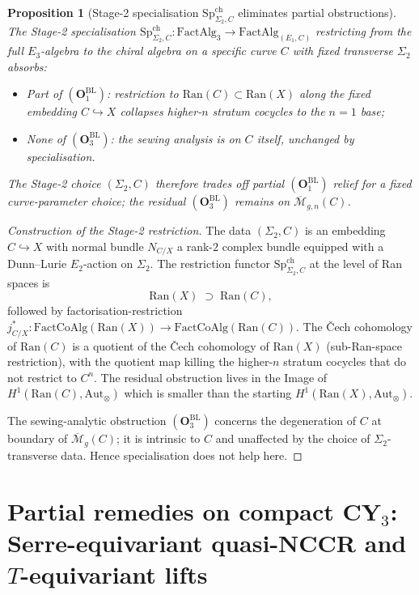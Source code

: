 \documentclass[11pt]{amsart}
\newtheorem{proposition}[theorem]{Proposition}
\newcommand{\Ran}{\mathrm{Ran}}
\newcommand{\FactCoAlg}{\mathrm{FactCoAlg}}
\newcommand{\Mbar}{\overline{\mathcal{M}}}
\begin{document}
\begin{proposition}[Stage-2 specialisation $\mathrm{Sp}^{\mathrm{ch}}_{\Sigma_2, C}$
eliminates partial obstructions]
\label{prop:stage-two-lift}
The Stage-2 specialisation
$\mathrm{Sp}^{\mathrm{ch}}_{\Sigma_2, C} : \mathrm{FactAlg}_3 \to
\mathrm{FactAlg}_{(E_1, C)}$ restricting from the full $E_3$-algebra
to the chiral algebra on a specific curve $C$ with fixed transverse
$\Sigma_2$ absorbs:
\begin{itemize}[leftmargin=2em]
\item \emph{Part of $(\mathbf{O}_1^{\mathrm{BL}})$}: restriction to
$\Ran(C) \subset \Ran(X)$ along the fixed embedding $C \hookrightarrow X$
collapses higher-$n$ stratum cocycles to the $n=1$ base;
\item \emph{None of $(\mathbf{O}_3^{\mathrm{BL}})$}: the sewing
analysis is on $C$ itself, unchanged by specialisation.
\end{itemize}
The Stage-2 choice $(\Sigma_2, C)$ therefore trades off partial
$(\mathbf{O}_1^{\mathrm{BL}})$ relief for a fixed curve-parameter
choice; the residual $(\mathbf{O}_3^{\mathrm{BL}})$ remains on
$\Mbar_{g,n}(C)$.
\end{proposition}

\begin{proof}[Construction of the Stage-2 restriction]
The data $(\Sigma_2, C)$ is an embedding $C \hookrightarrow X$
with normal bundle $N_{C/X}$ a rank-$2$ complex bundle equipped
with a Dunn--Lurie $E_2$-action on $\Sigma_2$. The restriction
functor $\mathrm{Sp}^{\mathrm{ch}}_{\Sigma_2, C}$ at the level of
Ran spaces is
\[
\Ran(X) \;\supset\; \Ran(C),
\]
followed by factorisation-restriction
$j^*_{C/X} : \FactCoAlg(\Ran(X)) \to \FactCoAlg(\Ran(C))$. The
\v{C}ech cohomology of $\Ran(C)$ is a quotient of the \v{C}ech
cohomology of $\Ran(X)$ (sub-Ran-space restriction), with the
quotient map killing the higher-$n$ stratum cocycles that do not
restrict to $C^n$. The residual obstruction lives in the
Image of $H^1(\Ran(C), \mathrm{Aut}_\otimes)$ which is smaller
than the starting $H^1(\Ran(X), \mathrm{Aut}_\otimes)$.

The sewing-analytic obstruction $(\mathbf{O}_3^{\mathrm{BL}})$
concerns the degeneration of $C$ at boundary of $\Mbar_g(C)$; it
is intrinsic to $C$ and unaffected by the choice of
$\Sigma_2$-transverse data. Hence specialisation does not help
here.
\end{proof}

\section{Partial remedies on compact CY$_3$: Serre-equivariant
quasi-NCCR and $T$-equivariant lifts}
\label{sec:partial-remedies}
\end{document}
